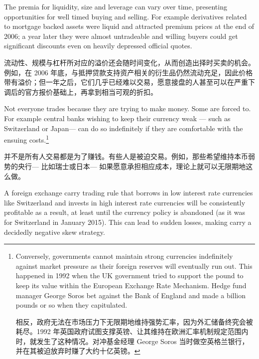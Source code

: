 \begin{englishblock} The premia for liquidity, size and leverage can vary over time, presenting opportunities for well timed buying and selling. For example derivatives related to mortgage backed assets were liquid and attracted premium prices at the end of 2006; a year later they were almost untradeable and willing buyers could get significant discounts even on heavily depressed official quotes. \end{englishblock}

\begin{chineseblock}流动性、规模与杠杆所对应的溢价还会随时间变化，从而创造出择时买卖的机会。例如，在 2006 年底，与抵押贷款支持资产相关的衍生品仍然流动充足，因此价格带有溢价；但一年之后，它们几乎已经难以交易，愿意接盘的人甚至可以在严重下调后的官方报价基础上，再拿到相当可观的折扣。\end{chineseblock}


\begin{englishblock} Not everyone trades because they are trying to make money. Some are forced to. For example central banks wishing to keep their currency weak --- such as Switzerland or Japan--- can do so indefinitely if they are comfortable with the ensuing costs.\footnote{Conversely, governments cannot maintain strong currencies indefinitely against market pressure as their foreign reserves will eventually run out. This happened in 1992 when the UK government tried to support the pound to keep its value within the European Exchange Rate Mechanism. Hedge fund manager George Soros bet against the Bank of England and made a billion pounds or so when they capitulated. \par 相反，政府无法在市场压力下无限期地维持强势汇率，因为外汇储备终究会被耗尽。1992 年英国政府试图支撑英镑、让其维持在欧洲汇率机制规定范围内时，就发生了这种情况。对冲基金经理 George Soros 当时做空英格兰银行，并在其被迫放弃时赚了大约十亿英镑。}\end{englishblock}

\begin{chineseblock}并不是所有人交易都是为了赚钱。有些人是被迫交易。例如，那些希望维持本币弱势的央行--- 比如瑞士或日本--- 如果愿意承担相应成本，理论上就可以无限期地这么做。\end{chineseblock}

\bipairgap

\begin{englishblock} A foreign exchange carry trading rule that borrows in low interest rate currencies like Switzerland and invests in high interest rate currencies will be consistently profitable as a result, at least until the currency policy is abandoned (as it was for Switzerland in January 2015). This can lead to sudden losses, making carry a decidedly negative skew strategy. \end{englishblock}

